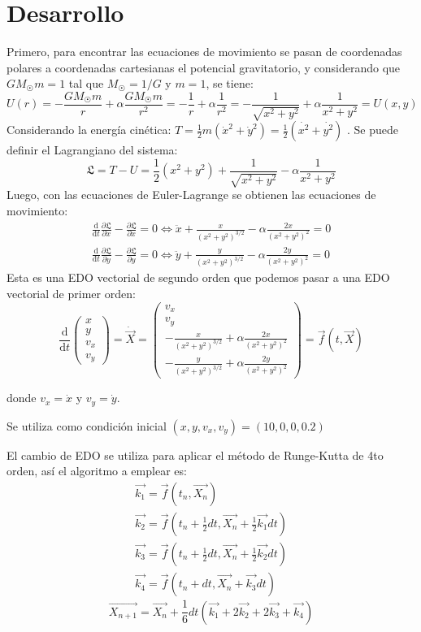\documentclass[letterpaper,oneside]{article}
\begin{document}
\section{Desarrollo}
Primero, para encontrar las ecuaciones de movimiento se pasan  de coordenadas polares a coordenadas cartesianas el potencial gravitatorio, y considerando que $GM_{\astrosun}m=1$ tal que $M_{\astrosun}=1/G$ y $m=1$, se tiene:
$$U(r)=-\frac{GM_{\astrosun}m}{r}+\alpha \frac{GM_\astrosun m}{r^2}=-\frac{1}{r}+\alpha \frac{1}{r^2}=-\frac{1}{\sqrt{x^2+y^2}}+\alpha\frac{1}{x^2+y^2}= U(x,y) $$
Considerando la energía cinética: $T=\frac{1}{2}m(\dot{x}^2+\dot{y}^2)=\frac{1}{2}(\dot{x^2}+\dot{y^2})$
. Se puede definir el Lagrangiano del sistema:
$$ \mathfrak{L} = T-U =\frac{1}{2}(x^2+y^2)+\frac{1}{\sqrt{x^2+y^2}}-\alpha\frac{1}{x^2+y^2} $$
Luego, con las ecuaciones de Euler-Lagrange se obtienen las ecuaciones de movimiento:
$$\begin{matrix}
\frac{\mathrm{d} }{\mathrm{d} t}\frac{\partial \mathfrak{L}}{\partial \dot{x}}-\frac{\partial \mathfrak{L}}{\partial x}=0\Leftrightarrow      \ddot{x}+\frac{x}{(x^2+y^2)^{3/2}}-\alpha\frac{2x}{(x^2+y^2)^2}=0\\ 
\frac{\mathrm{d} }{\mathrm{d} t}\frac{\partial \mathfrak{L}}{\partial \dot{y}}-\frac{\partial \mathfrak{L}}{\partial y}  =0     \Leftrightarrow \ddot{y}+\frac{y}{(x^2+y^2)^{3/2}}-\alpha\frac{2y}{(x^2+y^2)^2}=0
\end{matrix}  $$
Esta es una EDO vectorial de segundo orden que podemos pasar a una EDO vectorial de primer orden:
$$
\frac{\mathrm{d} }{\mathrm{d} t}
\begin{pmatrix}
x\\ 
y\\ 
v_x\\ 
v_y
\end{pmatrix}
=\dot{\vec{X}}=
\begin{pmatrix}
v_x\\ 
v_y\\
-\frac{x}{(x^2+y^2)^{3/2}}+\alpha\frac{2x}{(x^2+y^2)^2}\\ 
-\frac{y}{(x^2+y^2)^{3/2}}+\alpha\frac{2y}{(x^2+y^2)^2}

\end{pmatrix}
=\vec{f}(t,\vec{X})
$$

donde $v_x=\dot{x}$ y $v_y=\dot{y}$. 

Se utiliza como condición inicial $(x,y,v_x,v_y)=(10,0,0,0.2)$

El cambio de EDO se utiliza para aplicar el método de Runge-Kutta de 4to orden, así el algoritmo a emplear es:
$$\begin{matrix}
\vec{k_1}=\vec{f}(t_n,\vec{X_n})\\ 
\vec{k_2}=\vec{f}(t_n+\frac{1}{2}dt,\vec{X_n}+\frac{1}{2}\vec{k_1}dt)\\ 
\vec{k_3}=\vec{f}(t_n+\frac{1}{2}dt,\vec{X_n}+\frac{1}{2}\vec{k_2}dt)\\ 
\vec{k_4}=\vec{f}(t_n+dt,\vec{X_n}+\vec{k_3}dt)
\end{matrix}$$
$$\vec{X_{n+1}}=\vec{X_n}+\frac{1}{6}dt(\vec{k_1}+2\vec{k_2}+2\vec{k_3}+\vec{k_4}) $$
\end{document}
